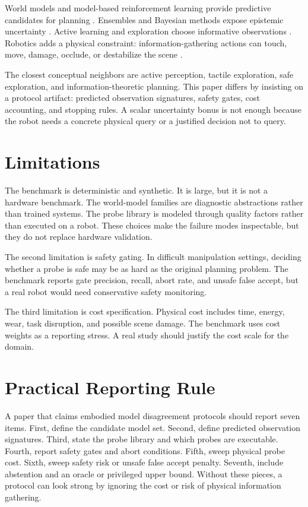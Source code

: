 \documentclass{article}
\begin{document}
World models and model-based reinforcement learning provide predictive candidates for planning \citep{ha2018world,nagabandi2018neural}. Ensembles and Bayesian methods expose epistemic uncertainty \citep{lakshminarayanan2017simple,chua2018deep}. Active learning and exploration choose informative observations \citep{settles2009active}. Robotics adds a physical constraint: information-gathering actions can touch, move, damage, occlude, or destabilize the scene \citep{levine2016end,brohan2023rt1}.

The closest conceptual neighbors are active perception, tactile exploration, safe exploration, and information-theoretic planning. This paper differs by insisting on a protocol artifact: predicted observation signatures, safety gates, cost accounting, and stopping rules. A scalar uncertainty bonus is not enough because the robot needs a concrete physical query or a justified decision not to query.

\section{Limitations}

The benchmark is deterministic and synthetic. It is large, but it is not a hardware benchmark. The world-model families are diagnostic abstractions rather than trained systems. The probe library is modeled through quality factors rather than executed on a robot. These choices make the failure modes inspectable, but they do not replace hardware validation.

The second limitation is safety gating. In difficult manipulation settings, deciding whether a probe is safe may be as hard as the original planning problem. The benchmark reports gate precision, recall, abort rate, and unsafe false accept, but a real robot would need conservative safety monitoring.

The third limitation is cost specification. Physical cost includes time, energy, wear, task disruption, and possible scene damage. The benchmark uses cost weights as a reporting stress. A real study should justify the cost scale for the domain.

\section{Practical Reporting Rule}

A paper that claims embodied model disagreement protocols should report seven items. First, define the candidate model set. Second, define predicted observation signatures. Third, state the probe library and which probes are executable. Fourth, report safety gates and abort conditions. Fifth, sweep physical probe cost. Sixth, sweep safety risk or unsafe false accept penalty. Seventh, include abstention and an oracle or privileged upper bound. Without these pieces, a protocol can look strong by ignoring the cost or risk of physical information gathering.
\end{document}
